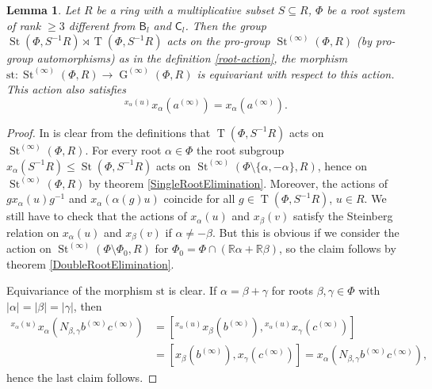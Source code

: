 \documentclass{article}
\numberwithin{equation}{section}
\newtheorem{lemma}{Lemma} \numberwithin{lemma}{section}
\theoremstyle{definition}
\theoremstyle{remark}
\DeclareMathOperator\St{St}
\DeclareMathOperator\GG{G}
\DeclareMathOperator\Torus{T}
\newcommand{\up}[2]{{^{#1}\!{#2}}}
\newcommand{\rB}{\mathsf{B}}
\newcommand{\rC}{\mathsf{C}}
\begin{document}
\begin{lemma}\label{SteinbergLocalAction}
 Let \(R\) be a ring with a multiplicative subset \(S \subseteq R\), \(\Phi\) be a root system of rank \(\geq 3\) different from \(\rB_l\) and \(\rC_l\). Then the group \(\St(\Phi, S^{-1} R) \rtimes \Torus(\Phi, S^{-1} R)\) acts on the pro-group \(\St^{(\infty)}(\Phi, R)\) (by pro-group automorphisms) as in the definition \ref{root-action}, the morphism \(\mathrm{st} \colon \St^{(\infty)}(\Phi, R) \to \GG^{(\infty)}(\Phi, R)\) is equivariant with respect to this action. This action also satisfies
 \[\up{x_\alpha(u)}{x_\alpha(a^{(\infty)})} = x_\alpha(a^{(\infty)}).\]
\end{lemma}
\begin{proof}
 In is clear from the definitions that \(\Torus(\Phi, S^{-1} R)\) acts on \(\St^{(\infty)}(\Phi, R)\). For every root \(\alpha \in \Phi\) the root subgroup \(x_\alpha(S^{-1} R) \leq \St(\Phi, S^{-1} R)\) acts on \(\St^{(\infty)}(\Phi \setminus \{\alpha, -\alpha\}, R)\), hence on \(\St^{(\infty)}(\Phi, R)\) by theorem \ref{SingleRootElimination}. Moreover, the actions of \(g x_\alpha(u) g^{-1}\) and \(x_\alpha(\alpha(g) u)\) coincide for all \(g \in \Torus(\Phi, S^{-1} R)\), \(u \in R\). We still have to check that the actions of \(x_\alpha(u)\) and \(x_\beta(v)\) satisfy the Steinberg relation on \(x_\alpha(u)\) and \(x_\beta(v)\) if \(\alpha \neq -\beta\). But this is obvious if we consider the action on \(\St^{(\infty)}(\Phi \setminus \Phi_0, R)\) for \(\Phi_0 = \Phi \cap (\mathbb R\alpha + \mathbb R\beta)\), so the claim follows by theorem \ref{DoubleRootElimination}.

 Equivariance of the morphism \(\mathrm{st}\) is clear. If \(\alpha = \beta + \gamma\) for roots \(\beta, \gamma \in \Phi\) with \(|\alpha| = |\beta| = |\gamma|\), then
 \begin{align*}
  \up{x_\alpha(u)}{x_\alpha(N_{\beta, \gamma} b^{(\infty)} c^{(\infty)})} &= [\up{x_\alpha(u)}{x_\beta(b^{(\infty)})}, \up{x_\alpha(u)}{x_\gamma(c^{(\infty)})}]\\
  &= [x_\beta(b^{(\infty)}), x_\gamma(c^{(\infty)})] = x_\alpha(N_{\beta, \gamma} b^{(\infty)} c^{(\infty)}),
 \end{align*}
 hence the last claim follows.
\end{proof}
\end{document}
